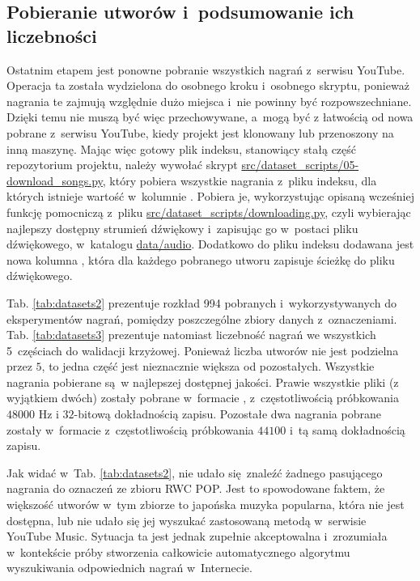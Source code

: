 \subsection{Pobieranie utworów i~podsumowanie ich liczebności}

Ostatnim etapem jest ponowne pobranie wszystkich nagrań z~serwisu YouTube. Operacja ta została wydzielona do osobnego kroku i~osobnego skryptu, ponieważ nagrania te zajmują względnie dużo miejsca i~nie powinny być rozpowszechniane. Dzięki temu nie muszą być więc przechowywane, a~mogą być z łatwością od nowa pobrane z~serwisu YouTube, kiedy projekt jest klonowany lub przenoszony na inną maszynę. Mając więc gotowy plik indeksu, stanowiący stałą część repozytorium projektu, należy wywołać skrypt \url{src/dataset_scripts/05-download_songs.py}, który pobiera wszystkie nagrania z~pliku indeksu, dla których istnieje wartość w~kolumnie . Pobiera je, wykorzystując opisaną wcześniej funkcję pomocniczą z~pliku \url{src/dataset_scripts/downloading.py}, czyli wybierając najlepszy dostępny strumień dźwiękowy i~zapisując go w~postaci pliku dźwiękowego, w~katalogu \url{data/audio}. Dodatkowo do pliku indeksu dodawana jest nowa kolumna , która dla każdego pobranego utworu zapisuje ścieżkę do pliku dźwiękowego.

Tab. \ref{tab:datasets2} prezentuje rozkład 994 pobranych i~wykorzystywanych do eksperymentów nagrań, pomiędzy poszczególne zbiory danych z~oznaczeniami. Tab. \ref{tab:datasets3} prezentuje natomiast liczebność nagrań we wszystkich 5~częściach do walidacji krzyżowej. Ponieważ liczba utworów nie jest podzielna przez $5$, to jedna część jest nieznacznie większa od pozostałych.  Wszystkie nagrania pobierane są w najlepszej dostępnej jakości. Prawie wszystkie pliki (z wyjątkiem dwóch) zostały pobrane w~formacie , z~częstotliwością próbkowania $48000$ Hz i $32$-bitową dokładnością zapisu. Pozostałe dwa nagrania pobrane zostały w~formacie  z~częstotliwością próbkowania $44100$ i~tą samą dokładnością zapisu.

Jak widać w~Tab. \ref{tab:datasets2}, nie udało się znaleźć żadnego pasującego nagrania do oznaczeń ze zbioru RWC POP. Jest to spowodowane faktem, że większość utworów w~tym zbiorze to japońska muzyka popularna, która nie jest dostępna, lub nie udało się jej wyszukać zastosowaną metodą w~serwisie YouTube Music. Sytuacja ta jest jednak zupełnie akceptowalna i~zrozumiała w~kontekście próby stworzenia całkowicie automatycznego algorytmu wyszukiwania odpowiednich nagrań w~Internecie.

